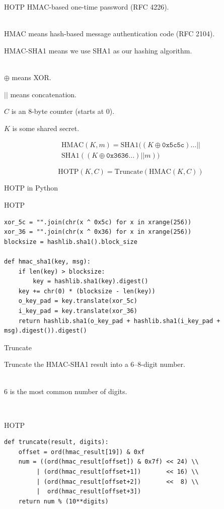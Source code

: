 \documentclass{beamer}
\def\py{
  \lstset{
     language=Python,
     extendedchars=true,
     basicstyle=\footnotesize\ttfamily,
     showstringspaces=false,
     showspaces=false,
     numbersep=9pt,
     tabsize=2,
     breaklines=true,
     showtabs=false,
     captionpos=b
  }
}
\begin{document}
\begin{frame}{HOTP}
HMAC-based one-time password (RFC 4226).

\ \\

HMAC means hash-based message authentication code (RFC 2104).

HMAC-SHA1 means we use SHA1 as our hashing algorithm.

\ \\

$\oplus$ means XOR.

$||$ means concatenation.

$C$ is an 8-byte counter (starts at 0).

$K$ is some shared secret.

\begin{multline*}
\text{HMAC}(K, m) = \text{SHA1}((K \oplus \texttt{0x5c5c}) \dots || \\ \text{SHA1}((K \oplus \texttt{0x3636}\dots) || m))
\end{multline*}

$$\text{HOTP}(K, C) = \text{Truncate}(\text{HMAC}(K, C))$$
\end{frame}

\begin{frame}[fragile]{HOTP in Python}

\begin{block}{HOTP}
\py
\begin{lstlisting}
xor_5c = "".join(chr(x ^ 0x5c) for x in xrange(256))
xor_36 = "".join(chr(x ^ 0x36) for x in xrange(256))
blocksize = hashlib.sha1().block_size

def hmac_sha1(key, msg):
    if len(key) > blocksize:
        key = hashlib.sha1(key).digest()
    key += chr(0) * (blocksize - len(key))
    o_key_pad = key.translate(xor_5c)
    i_key_pad = key.translate(xor_36)
    return hashlib.sha1(o_key_pad + hashlib.sha1(i_key_pad + msg).digest()).digest()
\end{lstlisting}
\end{block}
\end{frame}

\begin{frame}[fragile]{Truncate}

Truncate the HMAC-SHA1 result into a 6--8-digit number.

\ \\

6 is the most common number of digits.

\ \\

\begin{block}{HOTP}
\py
\begin{lstlisting}
def truncate(result, digits):
    offset = ord(hmac_result[19]) & 0xf
    num = ((ord(hmac_result[offset]) & 0x7f) << 24) \\
         | (ord(hmac_result[offset+1])       << 16) \\
         | (ord(hmac_result[offset+2])       <<  8) \\
         |  ord(hmac_result[offset+3])
    return num % (10**digits)
\end{lstlisting}
\end{block}
\end{frame}
\end{document}
